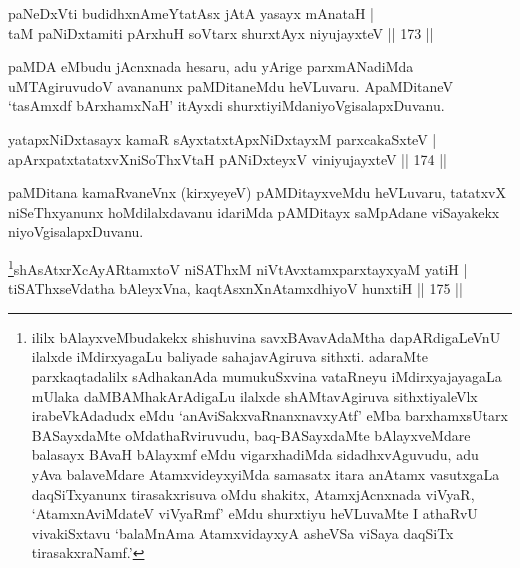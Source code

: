 
\begin{shl}
paNeDxVti budidhxnAmeYtatAsx jAtA yasayx mAnataH |\\
taM paNiDxtamiti pArxhuH soV\s tarx shurxtAyx niyujayxteV \hfill || 173 ||
\end{shl}

\begin{artha}
paMDA eMbudu jAcnxnada hesaru, adu yArige parxmANadiMda uMTAgiruvudoV avananunx paMDitaneMdu heVLuvaru. A\break paMDitaneV `tasAmxdf bArxhamxNaH' itAyxdi shurxtiyiMda\break niyoVgisalapxDuvanu.
\end{artha}


\begin{shl}
yatapxNiDxtasayx kamaR sAyxtatxtApxNiDxtayxM parxcakaSxteV |\\
apArxpatxtatatxvXniSoThxV\s taH pANiDxteyxV viniyujayxteV \hfill || 174 ||
\end{shl}

\begin{artha}
paMDitana kamaRvaneVnx (kirxyeyeV) pAMDitayxveMdu heVLuvaru, tatatxvX niSeThxyanunx hoMdilalxdavanu idariMda pAMDitayx saMpAdane viSayakekx niyoVgisalapxDuvanu.
\end{artha}



\begin{shl}
\footnote{ililx bAlayxveMbudakekx shishuvina savxBAvavAdaMtha dapARdigaLeVnU ilalxde iMdirxyagaLu baliyade sahajavAgiruva sithxti. adaraMte parxkaqtadalilx sAdhakanAda mumukuSxvina vataRneyu iMdirxyajayagaLa mUlaka daMBAMhakArAdigaLu ilalxde shAMtavAgiruva sithxtiyaleVlx irabeVkAdadudx eMdu `anAviSakxvaRnanxnavxyAtf' eMba barxhamxsUtarx BASayxdaMte oMdathaRviruvudu, baq-BASayxdaMte bAlayxveMdare balasayx BAvaH bAlayxmf eMdu vigarxhadiMda sidadhxvAguvudu, adu yAva balaveMdare AtamxvideyxyiMda samasatx itara anAtamx vasutxgaLa daqSiTxyanunx  tirasakxrisuva oMdu shakitx, AtamxjAcnxnada viVyaR, `AtamxnA\break viMdateV viVyaRmf' eMdu shurxtiyu heVLuvaMte I athaRvU vivakiSxtavu `balaMnAma AtamxvidayxyA asheVSa viSaya daqSiTx tirasakxraNamf.'}shAsAtxrXcAyARtamxtoV niSAThxM niVtAvx\s \s tamxparxtayxyaM yatiH |\\
tiSAThxseVdatha bAleyxVna, kaqtAsxnXnAtamxdhiyoV hunxtiH \hfill || 175 ||
\end{shl}

